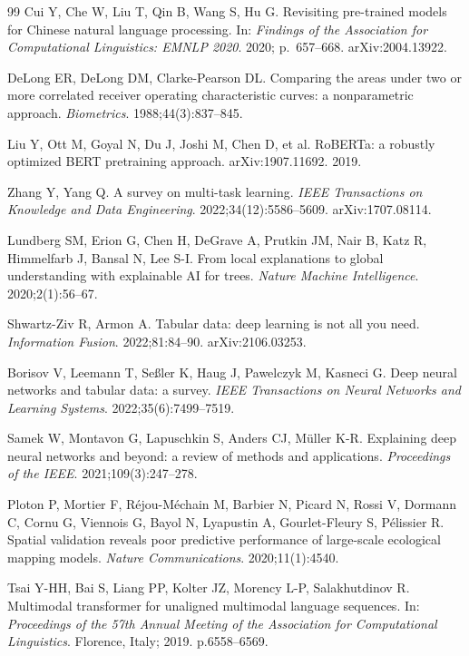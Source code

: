 \documentclass[12pt, a4paper]{article}
\begin{document}
\begin{thebibliography}{99}
Cui Y, Che W, Liu T, Qin B, Wang S, Hu G.
Revisiting pre-trained models for Chinese natural language
processing.
In: \textit{Findings of the Association for Computational
Linguistics: EMNLP 2020}. 2020; p.\ 657--668.
arXiv:2004.13922.

DeLong ER, DeLong DM, Clarke-Pearson DL.
Comparing the areas under two or more correlated receiver
operating characteristic curves: a nonparametric approach.
\textit{Biometrics}. 1988;44(3):837--845.

Liu Y, Ott M, Goyal N, Du J, Joshi M, Chen D, et al.
RoBERTa: a robustly optimized BERT pretraining approach.
arXiv:1907.11692. 2019.

Zhang Y, Yang Q.
A survey on multi-task learning.
\textit{IEEE Transactions on Knowledge and Data Engineering}.
2022;34(12):5586--5609.
arXiv:1707.08114.

Lundberg SM, Erion G, Chen H, DeGrave A, Prutkin JM, Nair B,
Katz R, Himmelfarb J, Bansal N, Lee S-I.
From local explanations to global understanding with explainable
AI for trees.
\textit{Nature Machine Intelligence}.
2020;2(1):56--67.

Shwartz-Ziv R, Armon A.
Tabular data: deep learning is not all you need.
\textit{Information Fusion}.
2022;81:84--90.
arXiv:2106.03253.

Borisov V, Leemann T, Seßler K, Haug J, Pawelczyk M, Kasneci G.
Deep neural networks and tabular data: a survey.
\textit{IEEE Transactions on Neural Networks and Learning Systems}.
2022;35(6):7499--7519.

Samek W, Montavon G, Lapuschkin S, Anders CJ, M\"uller K-R.
Explaining deep neural networks and beyond: a review of methods
and applications.
\textit{Proceedings of the IEEE}.
2021;109(3):247--278.

Ploton P, Mortier F, R\'ejou-M\'echain M, Barbier N, Picard N,
Rossi V, Dormann C, Cornu G, Viennois G, Bayol N, Lyapustin A,
Gourlet-Fleury S, P\'elissier R.
Spatial validation reveals poor predictive performance of
large-scale ecological mapping models.
\textit{Nature Communications}.
2020;11(1):4540.

Tsai Y-HH, Bai S, Liang PP, Kolter JZ, Morency L-P, Salakhutdinov R.
Multimodal transformer for unaligned multimodal language sequences.
In: \textit{Proceedings of the 57th Annual Meeting of the
Association for Computational Linguistics}. Florence, Italy;
2019. p.6558--6569.


\end{thebibliography}
\end{document}
